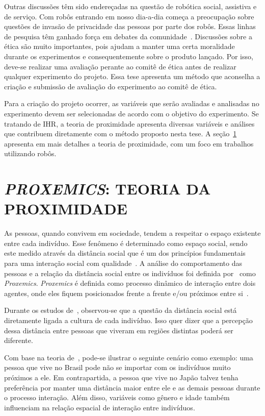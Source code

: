 Outras discussões têm sido endereçadas na questão de robótica social, assistiva e de serviço. Com robôs entrando em nosso dia-a-dia começa a preocupação sobre questões de invasão de privacidade das pessoas por parte dos robôs. Essas linhas de pesquisa têm ganhado força em debates da comunidade~\cite{rueben:2017}. Discussões sobre a ética são muito importantes, pois ajudam a manter uma certa moralidade durante os experimentos e consequentemente sobre o produto lançado. Por isso, deve-se realizar uma avaliação perante ao comitê de ética antes de realizar qualquer experimento do projeto. Essa tese apresenta um método que aconselha a criação e submissão de avaliação do experimento ao comitê de ética.

Para a criação do projeto ocorrer, as variáveis que serão avaliadas e analisadas no experimento devem ser selecionadas de acordo com o objetivo do experimento. Se tratando de IHR, a teoria de proximidade apresenta diversas variáveis e análises que contribuem diretamente com o método proposto nesta tese. A seção~\ref{sec:proxemics} apresenta em mais detalhes a teoria de proximidade, com um foco em trabalhos utilizando robôs.

\section{\emph{PROXEMICS}: TEORIA DA PROXIMIDADE}
\label{sec:proxemics}
As pessoas, quando convivem em sociedade, tendem a respeitar o espaço existente entre cada indivíduo. Esse fenômeno é determinado como espaço social, sendo este medido através da distância social que é um dos princípios fundamentais para uma interação social com qualidade~\cite{hall:1969, henkel:2014}. A análise do comportamento das pessoas e a relação da distância social entre os indivíduos foi definida por~\textcite{hall:1969} como \emph{Proxemics}. \emph{Proxemics} é definida como processo dinâmico de interação entre dois agentes, onde eles fiquem posicionados frente a frente e/ou próximos entre si~\cite{mead:2011b}.

Durante os estudos de~\textcite{hall:1969}, observou-se que a questão da distância social está diretamente ligada a cultura de cada indivíduo. Isso quer dizer que a percepção dessa distância entre pessoas que viveram em regiões distintas poderá ser diferente.

Com base na teoria de~\textcite{hall:1969}, pode-se ilustrar o seguinte cenário como exemplo: uma pessoa que vive no Brasil pode não se importar com os indivíduos muito próximos a ele. Em contrapartida, a pessoa que vive no Japão talvez tenha preferência por manter uma distância maior entre ele e as demais pessoas durante o processo interação. Além disso, variáveis como gênero e idade também influenciam na relação espacial de interação entre indivíduos.

